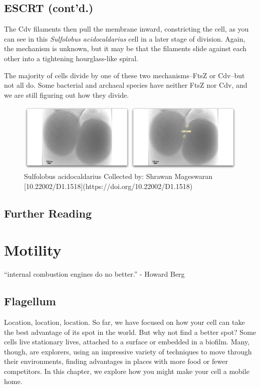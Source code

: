 \documentclass[]{tufte-book}
\begin{document}
\section{ESCRT (cont'd.)}\label{escrt-contd.}

The Cdv filaments then pull the membrane inward, constricting the cell,
as you can see in this \emph{Sulfolobus acidocaldarius} cell in a later
stage of division. Again, the mechanism is unknown, but it may be that
the filaments slide against each other into a tightening hourglass-like
spiral.

The majority of cells divide by one of these two mechanisms--FtsZ or
Cdv--but not all do. Some bacterial and archaeal species have neither
FtsZ nor Cdv, and we are still figuring out how they divide.

\begin{figure}
\includegraphics{movie_stills/5_12} \caption[Sulfolobus acidocaldarius Collected by]{Sulfolobus acidocaldarius Collected by: Shrawan Mageswaran [10.22002/D1.1518](https://doi.org/10.22002/D1.1518)}\label{fig:unnamed-chunk-98}
\end{figure}

\section{Further Reading}\label{further-reading-4}

\citet{badrinarayanan2015} \citet{hirsch1974} \citet{laloux2014}
\citet{reyes-lamothe2012}

\chapter{Motility}\label{motility}

``internal combustion engines do no better.'' - Howard Berg
\citet{berg1988}

\section{Flagellum}\label{flagellum}

Location, location, location. So far, we have focused on how your cell
can take the best advantage of its spot in the world. But why not find a
better spot? Some cells live stationary lives, attached to a surface or
embedded in a biofilm. Many, though, are explorers, using an impressive
variety of techniques to move through their environments, finding
advantages in places with more food or fewer competitors. In this
chapter, we explore how you might make your cell a mobile home.
\end{document}
